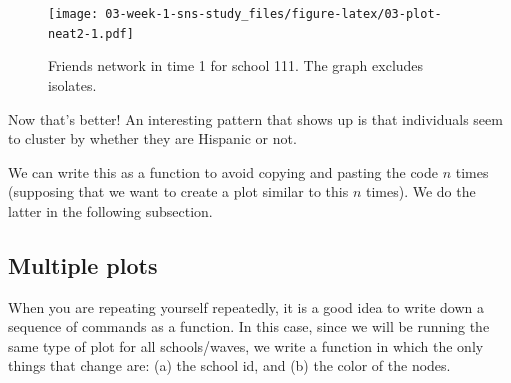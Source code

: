 \documentclass[]{book}
\newenvironment{Shaded}{\begin{snugshade}}{\end{snugshade}}
\newcommand{\CommentTok}[1]{\textcolor[rgb]{0.56,0.35,0.01}{\textit{#1}}}
\newcommand{\ControlFlowTok}[1]{\textcolor[rgb]{0.13,0.29,0.53}{\textbf{#1}}}
\newcommand{\DataTypeTok}[1]{\textcolor[rgb]{0.13,0.29,0.53}{#1}}
\newcommand{\DecValTok}[1]{\textcolor[rgb]{0.00,0.00,0.81}{#1}}
\newcommand{\FloatTok}[1]{\textcolor[rgb]{0.00,0.00,0.81}{#1}}
\newcommand{\KeywordTok}[1]{\textcolor[rgb]{0.13,0.29,0.53}{\textbf{#1}}}
\newcommand{\NormalTok}[1]{#1}
\newcommand{\OperatorTok}[1]{\textcolor[rgb]{0.81,0.36,0.00}{\textbf{#1}}}
\newcommand{\OtherTok}[1]{\textcolor[rgb]{0.56,0.35,0.01}{#1}}
\newcommand{\StringTok}[1]{\textcolor[rgb]{0.31,0.60,0.02}{#1}}
\begin{document}
\begin{figure}
\centering
\texttt{[image: 03-week-1-sns-study\_files/figure-latex/03-plot-neat2-1.pdf]}
\caption{\label{fig:03-plot-neat2}Friends network in time 1 for school 111. The graph excludes isolates.}
\end{figure}

Now that's better! An interesting pattern that shows up is that individuals seem to cluster by whether they are Hispanic or not.

We can write this as a function to avoid copying and pasting the code \(n\) times (supposing that we want to create a plot similar to this \(n\) times). We do the latter in the following subsection.

\hypertarget{multiple-plots}{%
\subsection{Multiple plots}\label{multiple-plots}}

When you are repeating yourself repeatedly, it is a good idea to write down a sequence of commands as a function. In this case, since we will be running the same type of plot for all schools/waves, we write a function in which the only things that change are: (a) the school id, and (b) the color of the nodes.

\begin{Shaded}
\end{Shaded}
\end{document}
